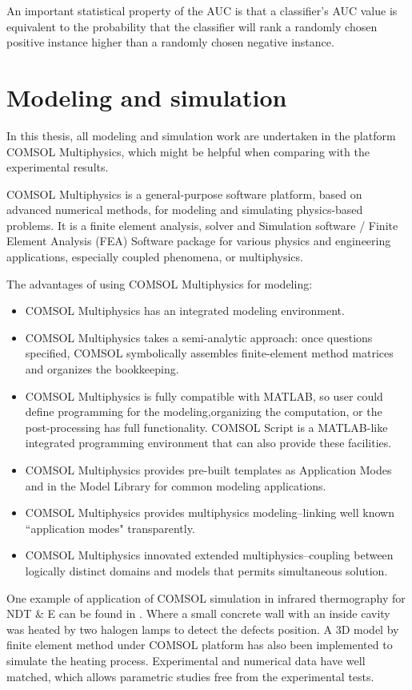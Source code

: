 An important statistical property of the AUC is that a classifier's AUC value is equivalent to the probability that the classifier will rank a randomly chosen positive instance higher than a randomly chosen negative instance. 

\section{Modeling and simulation}
In this thesis, all modeling and simulation work are undertaken in the platform COMSOL Multiphysics{\textregistered}, which might be helpful when comparing with the experimental results.

COMSOL Multiphysics is a general-purpose software platform, based on advanced numerical methods, for modeling and simulating physics-based problems. It is a finite element analysis, solver and Simulation software / Finite Element Analysis (FEA) Software package for various physics and engineering applications, especially coupled phenomena, or multiphysics.

The advantages of using COMSOL Multiphysics for modeling:
\begin{itemize}
	\item COMSOL Multiphysics has an integrated modeling environment.
	\item COMSOL Multiphysics takes a semi-analytic approach: once questions specified, COMSOL symbolically assembles finite-element method matrices and organizes the bookkeeping.
	\item COMSOL Multiphysics is fully compatible with MATLAB, so user could define programming for the modeling,organizing the computation, or the post-processing has full functionality. COMSOL Script is a MATLAB-like integrated programming environment that can also provide these facilities.
	\item COMSOL Multiphysics provides pre-built templates as Application Modes and in the Model Library for common modeling applications.
	\item COMSOL Multiphysics provides multiphysics modeling--linking well known ``application modes" transparently.
	\item COMSOL Multiphysics innovated extended multiphysics--coupling between logically distinct domains and models that permits simultaneous solution.
\end{itemize}


One example of application of COMSOL simulation in infrared thermography for NDT \& E can be found in \citep{Cannas2012Modeling}. Where a small concrete wall with an inside cavity was heated by two halogen lamps to detect the defects position. A 3D model by finite element method under COMSOL platform has also been implemented to simulate the heating process. Experimental and numerical data have well matched, which allows parametric studies free from the experimental tests.

 